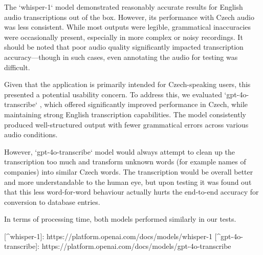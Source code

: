 \documentclass[
  digital,     %
  oneside,     %
  nosansbold,  %
  nocolorbold, %
  lof,         %
  lot,         %
]{fithesis4}
\begin{document}
\begin{markdown}
The `whisper-1` model demonstrated reasonably accurate results for English audio transcriptions out of the box. However, its performance with Czech audio was less consistent. While most outputs were legible, grammatical inaccuracies were occasionally present, especially in more complex or noisy recordings. It should be noted that poor audio quality significantly impacted transcription accuracy—though in such cases, even annotating the audio for testing was difficult.

Given that the application is primarily intended for Czech-speaking users, this presented a potential usability concern. To address this, we evaluated `gpt-4o-transcribe` , which offered significantly improved performance in Czech, while maintaining strong English transcription capabilities. The model consistently produced well-structured output with fewer grammatical errors across various audio conditions.

However, `gpt-4o-transcribe` model would always attempt to clean up the transcription too much and transform unknown words (for example names of companies) into similar Czech words. The transcription would be overall better and more understandable to the human eye, but upon testing it was found out that this less word-for-word behaviour actually hurts the end-to-end accuracy for conversion to database entries.

In terms of processing time, both models performed similarly in our tests. 

[^whisper-1]: https://platform.openai.com/docs/models/whisper-1
[^gpt-4o-transcribe]: https://platform.openai.com/docs/models/gpt-4o-transcribe

\end{markdown}
\shorthandon{-}
\end{document}
